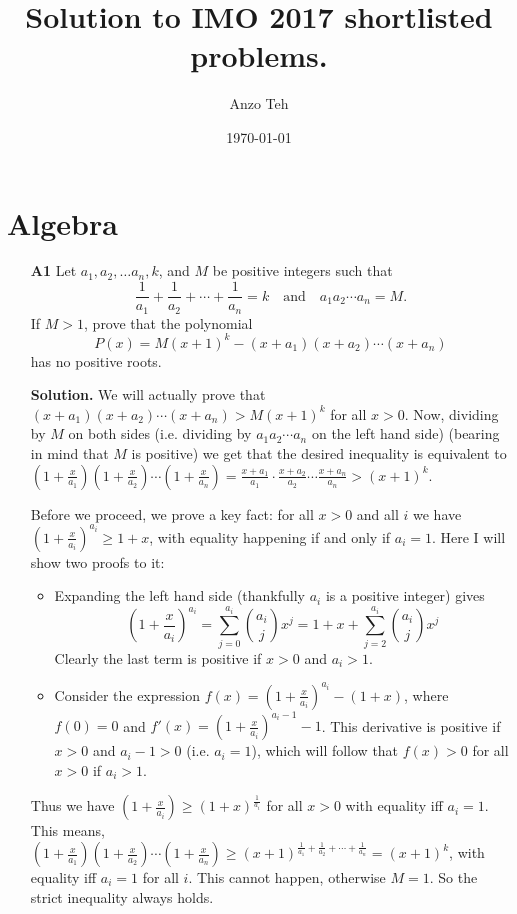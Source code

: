 \documentclass[11pt,a4paper]{article}
\begin{document}
\newcommand{\la}{\leftarrow}
\newcommand{\lra}{\leftrightarrow}


\title{Solution to IMO 2017 shortlisted problems.}
\author{Anzo Teh}
\date{\today}
\maketitle

\newpage
\section{Algebra}
\begin{enumerate}
	\item[\textbf{A1}]Let $a_1,a_2,\ldots a_n,k$, and $M$ be positive integers such that
	$$\frac{1}{a_1}+\frac{1}{a_2}+\cdots+\frac{1}{a_n}=k\quad\text{and}\quad a_1a_2\cdots a_n=M.$$If $M>1$, prove that the polynomial
	$$P(x)=M(x+1)^k-(x+a_1)(x+a_2)\cdots (x+a_n)$$has no positive roots.
	
	\textbf{Solution.} We will actually prove that $(x+a_1)(x+a_2)\cdots (x+a_n) > M(x+1)^k$ for all $x > 0$. 
	Now, dividing by $M$ on both sides (i.e. dividing by $a_1a_2\cdots a_n$ on the left hand side) (bearing in mind that $M$ is positive) we get that the desired inequality is equivalent to 
	$(1+\frac{x}{a_1})(1+\frac{x}{a_2})\cdots (1+\frac{x}{a_n}) = \frac{x+a_1}{a_1}\cdot\frac{x+a_2}{a_2}\cdots \frac{x+a_n}{a_n} > (x+1)^k$. 
	
	Before we proceed, we prove a key fact: for all $x > 0$ and all $i$ we have $(1+\frac{x}{a_i})^{a_i} \ge 1+x$, with equality happening if and only if $a_i = 1$. Here I will show two proofs to it: 
	\begin{itemize}
		\item Expanding the left hand side (thankfully $a_i$ is a positive integer) gives 
		\[(1+\frac{x}{a_i})^{a_i}=\sum_{j=0}^{a_i}\binom{a_i}{j}x^j=1+x+\sum_{j=2}^{a_i}\binom{a_i}{j}x^j\]
		Clearly the last term is positive if $x>0$ and $a_i>1$. 
		\item Consider the expression $f(x)=(1+\frac{x}{a_i})^{a_i} - (1+x)$, where $f(0)=0$ and $f'(x)=(1+\frac{x}{a_i})^{a_i-1}-1$. This derivative is positive if $x>0$ and $a_i-1>0$ (i.e. $a_i=1$), which will follow that $f(x)>0$ for all $x>0$ if $a_i>1$. 
	\end{itemize}
Thus we have $(1+\frac{x}{a_i}) \ge (1+x)^{\frac{1}{a_i}}$ for all $x>0$ with equality iff $a_i=1$. This means, 
$(1+\frac{x}{a_1})(1+\frac{x}{a_2})\cdots (1+\frac{x}{a_n}) \ge (x+1)^{\frac{1}{a_1}+\frac{1}{a_2}+\cdots + \frac{1}{a_n}}=(x+1)^k$, with equality iff $a_i=1$ for all $i$. This cannot happen, otherwise $M=1$. So the strict inequality always holds. 


\end{enumerate}
\end{document}
